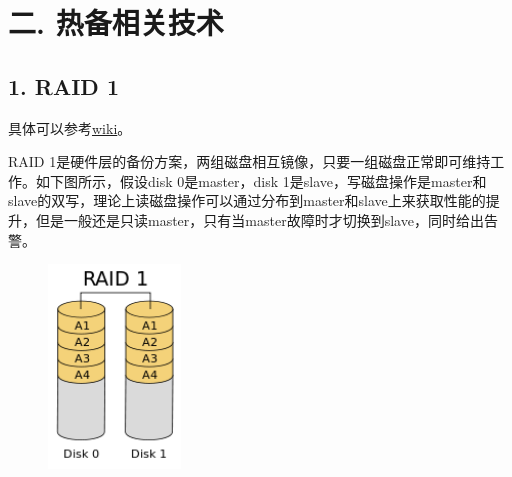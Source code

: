 \section* {\Large \ZHH 二. 热备相关技术} {
    \subsection* {1. RAID 1} {
        {具体可以参考\href{http://zh.wikipedia.org/wiki/RAID#RAID_1}{wiki}。}\par
        {RAID 1是硬件层的备份方案，两组磁盘相互镜像，只要一组磁盘正常即可维持工作。如下图所示，假设disk 0是master，disk 1是slave，写磁盘操作是master和slave的双写，理论上读磁盘操作可以通过分布到master和slave上来获取性能的提升，但是一般还是只读master，只有当master故障时才切换到slave，同时给出告警。}\par
        \begin {figure}[htbp]
            \centering
            \includegraphics [width=100pt, keepaspectratio] {raid_1.png}
        \end {figure}
    }

}
